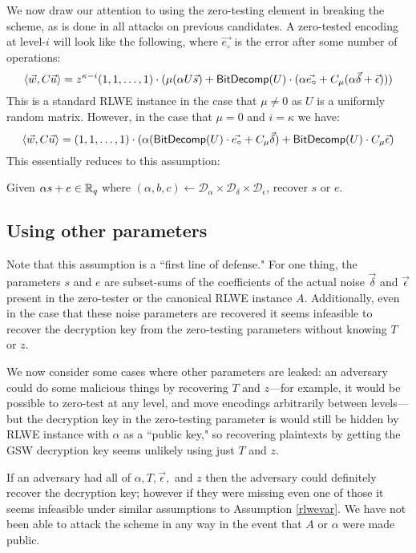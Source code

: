 We now draw our attention to using the zero-testing element in breaking the scheme, as is done in all attacks on previous candidates.  A zero-tested encoding at level-$i$ will look like the following, where $\vec{e_{\circ}}$ is the error after some number of operations:
$$\left<\vec{w}, C \vec{u}\right> = z^{\kappa-i}(1,1,\ldots,1)\cdot(\mu(\alpha U \vec{s}) + \mathsf{BitDecomp}(U)\cdot (\alpha\vec{e_\circ} + C_\mu(\alpha\vec{\delta} + \vec{\epsilon})))$$
This is a standard RLWE instance in the case that $\mu \not= 0$ as $U$ is a uniformly random matrix.  However, in the case that $\mu = 0$ and $i = \kappa$ we have:
\begin{equation}\label{eq:topleveltested}
\left<\vec{w}, C \vec{u}\right> = (1,1,\ldots,1)\cdot(\alpha (\mathsf{BitDecomp}(U)\cdot \vec{e_\circ} + C_\mu\vec{\delta}) + \mathsf{BitDecomp}(U)\cdot C_\mu\vec{\epsilon})
\end{equation}
This essentially reduces to this assumption:
\begin{assumption}
\label{rlwevar}
Given $\alpha s + e \in \mathbb{R}_q$ where $(\alpha, b, c) \leftarrow \mathcal{D}_\alpha \times \mathcal{D}_\delta \times \mathcal{D}_\epsilon$, recover $s$ or $e$.
\end{assumption}

\subsection{Using other parameters}
Note that this assumption is a ``first line of defense."  For one thing, the parameters $s$ and $e$ are subset-sums of the coefficients of the actual noise $\vec{\delta}$ and $\vec{\epsilon}$ present in the zero-tester or the canonical RLWE instance $A$. Additionally, even in the case that these noise parameters are recovered it seems infeasible to recover the decryption key from the zero-testing parameters without knowing $T$ or $z$.  

We now consider some cases where other parameters are leaked:  an adversary could do some malicious things by recovering $T$ and $z$---for example, it would be possible to zero-test at any level, and move encodings arbitrarily between levels---but the decryption key in the zero-testing parameter is would still be hidden by RLWE instance with $\alpha$ as a ``public key," so recovering plaintexts by getting the GSW decryption key seems unlikely using just $T$ and $z$.  

If an adversary had all of $\alpha, T, \vec{\epsilon},$ and $z$ then the adversary could definitely recover the decryption key; however if they were missing even one of those it seems infeasible under similar assumptions to Assumption \ref{rlwevar}.  We have not been able to attack the scheme in any way in the event that $A$ or $\alpha$ were made public.

